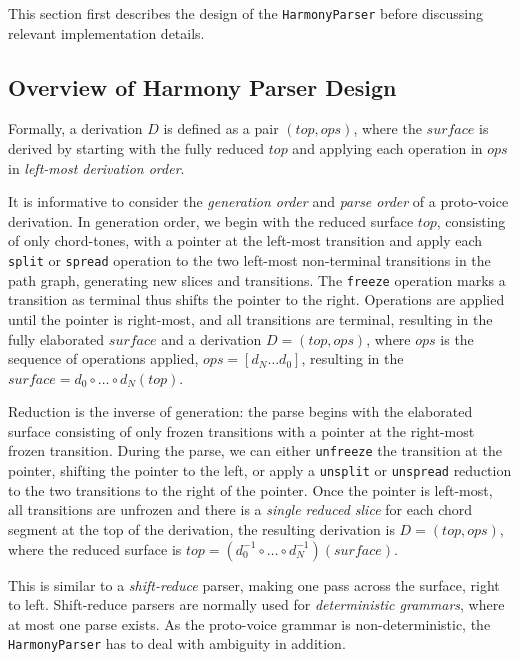 \documentclass[12pt,a4paper,twoside,openany]{report} \usepackage[pdfborder={0 0 0}]{hyperref}    %
\theoremstyle{definition} \newtheorem{definition}{Definition}[section]
\begin{document}
      This section first describes the design of the \texttt{HarmonyParser} before discussing relevant
      implementation details. 

      \subsection{Overview of Harmony Parser Design}

      Formally, a derivation $D$ is defined as a pair $(top, ops)$, where the $surface$ is derived by starting
      with the fully reduced $top$ and applying each operation in $ops$ in \textit{left-most derivation order}. 

      It is informative to consider the \textit{generation order} and \textit{parse order} of a proto-voice derivation.
      In generation order, we begin with the reduced surface $top$, consisting of only chord-tones, with a pointer at
      the left-most transition and apply each \texttt{split} or \texttt{spread} operation to the two left-most
      non-terminal transitions in the path graph, generating new slices and transitions. The \texttt{freeze} operation
      marks a transition as terminal thus shifts the pointer to the right. Operations are applied until the pointer is
      right-most, and all transitions are terminal, resulting in the fully elaborated $surface$ and a derivation
      $D=(top, ops)$, where $ops$ is the sequence of operations applied, $ops = [d_N \dots d_0]$, resulting in the
      $surface = d_0 \circ \dots \circ d_N (top) $.

      Reduction is the inverse of generation: the parse begins with the elaborated surface consisting of only frozen
      transitions with a pointer at the right-most frozen transition. During the parse, we can either \texttt{unfreeze}
      the transition at the pointer, shifting the pointer to the left, or apply a \texttt{unsplit} or \texttt{unspread}
      reduction to the two transitions to the right of the pointer. Once the pointer is left-most, all transitions are
      unfrozen and there is a \textit{single reduced slice} for each chord segment at the top of the derivation, the
      resulting derivation is $D = (top, ops)$, where the reduced surface is $top = (d_0^{-1} \circ \dots \circ
      d_N^{-1}) (surface)$.

      This is similar to a \textit{shift-reduce} parser, making one pass across the surface, right to left.
      Shift-reduce parsers are normally used for \textit{deterministic grammars}, where at most one parse exists.
      As the proto-voice grammar is non-deterministic, the \texttt{HarmonyParser} has to deal with ambiguity in
      addition. 
\end{document}
